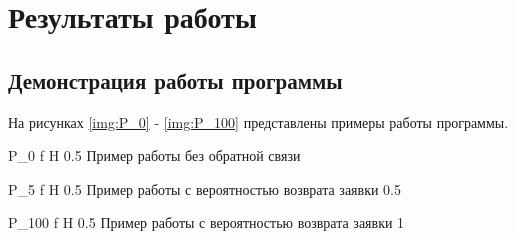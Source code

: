 \documentclass{bmstu}
\begin{document}
\chapter{Результаты работы}



\section{Демонстрация работы программы}

На рисунках \ref{img:P_0} - \ref{img:P_100} представлены примеры работы программы.

{P_0} %
{f} %
{H} %
{0.5\textwidth} %
{Пример работы без обратной связи} %




{P_5} %
{f} %
{H} %
{0.5\textwidth} %
{Пример работы с вероятностью возврата заявки 0.5} %



{P_100} %
{f} %
{H} %
{0.5\textwidth} %
{Пример работы с вероятностью возврата заявки 1} %
\end{document}
